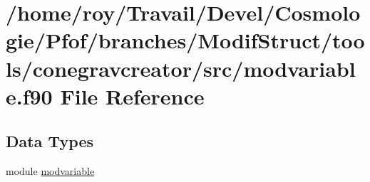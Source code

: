 \hypertarget{modvariable_8f90}{\section{/home/roy/\-Travail/\-Devel/\-Cosmologie/\-Pfof/branches/\-Modif\-Struct/tools/conegravcreator/src/modvariable.f90 File Reference}
\label{modvariable_8f90}
}
\subsection*{Data Types}
\begin{DoxyCompactItemize}
\item 
module \hyperlink{classmodvariable}{modvariable}
\end{DoxyCompactItemize}
